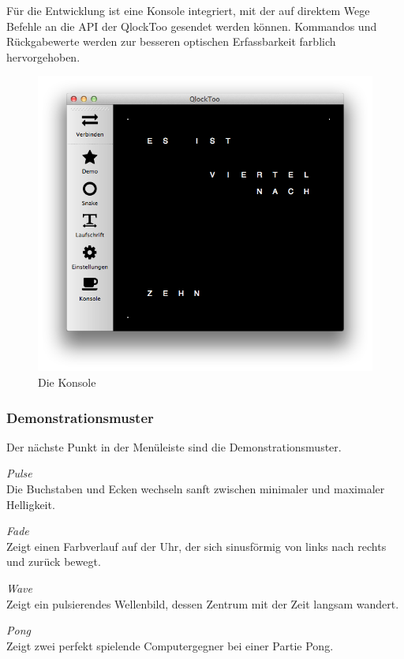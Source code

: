 Für die Entwicklung ist eine Konsole integriert, mit der auf direktem Wege Befehle an die API der QlockToo gesendet werden können. Kommandos und Rückgabewerte werden zur besseren optischen Erfassbarkeit farblich hervorgehoben.
%
\begin{figure}[h]
    \centering
    \includegraphics[draft,width=\columnwidth,draft]{Abbildungen/Screenshot}
    \caption[Konsole]{Die Konsole}
    \label{fig:Konsole}
\end{figure}
%

\subsubsection{Demonstrationsmuster}
Der nächste Punkt in der Menüleiste sind die Demonstrationsmuster.

\emph{Pulse} \\
Die Buchstaben und Ecken wechseln sanft zwischen minimaler und maximaler Helligkeit.

\emph{Fade} \\
Zeigt einen Farbverlauf auf der Uhr, der sich sinusförmig von links nach rechts und zurück bewegt.

\emph{Wave} \\
Zeigt ein pulsierendes Wellenbild, dessen Zentrum mit der Zeit langsam wandert.

\emph{Pong} \\
Zeigt zwei perfekt spielende Computergegner bei einer Partie Pong.

